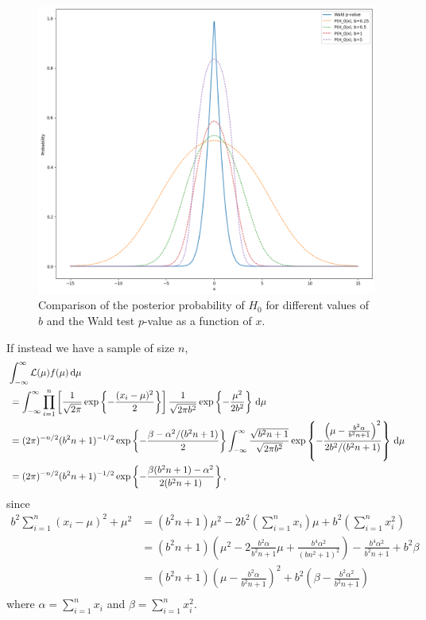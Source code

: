 \begin{ex}
  \inputminted{python}{../code/11-08a.py}
  \begin{figure}[H]
    \centering
    \includegraphics[scale=0.54]{../images/11-08a}
    \caption{Comparison of the posterior probability of $H_0$ for different
      values of $b$ and the Wald test $p$-value as a function of $x$.}
  \end{figure}

  If instead we have a sample of size $n$,
  \begin{align*}
     & \int_{-\infty}^\infty \mathcal{L}(\mu)f(\mu)\,\mathrm{d}\mu                                                                       \\
     & \,=\int_{-\infty}^\infty\prod_{i=1}^n\left[\frac{1}{\sqrt{2\pi}}\exp\left\{-\frac{(x_i-\mu)^2}{2}\right\}\right]
    \frac{1}{\sqrt{2\pi b^2}}\exp\left\{-\frac{\mu^2}{2b^2}\right\}\,\mathrm{d}\mu                                              \\
     & \, =(2\pi)^{-n/2}(b^2n+1)^{-1/2}\exp\left\{-\frac{\beta-\alpha^2/(b^2n+1)}{2}\right\}
    \int_{-\infty}^\infty \frac{\sqrt{b^2n+1}}{\sqrt{2\pi b^2}}\exp\left\{
    -\frac{\left(\mu-\frac{b^2\alpha}{b^2n+1}\right)^2}{2b^2/(b^2n+1)}
    \right\}\,\mathrm{d}{\mu}                                                                                                   \\
     & \, =(2\pi)^{-n/2}(b^2n+1)^{-1/2}\exp\left\{-\frac{\beta(b^2n+1)-\alpha^2}{2(b^2n+1)}\right\},
  \end{align*}
  since
  \begin{align*}
    b^2\sum_{i=1}^n(x_i-\mu)^2+\mu^2
     & =(b^2n+1)\mu^2-2b^2\left(\sum_{i=1}^nx_i\right)\mu+b^2\left(\sum_{i=1}^n x_i^2\right)                                        \\
     & =(b^2n+1)\left(\mu^2-2\frac{b^2\alpha}{b^2n+1}\mu+\frac{b^4\alpha^2}{(bn^2+1)^2} \right)-\frac{b^4\alpha^2}{b^2n+1}+b^2\beta \\
     & =(b^2n+1)\left(\mu-\frac{b^2\alpha}{b^2n+1}\right)^2+b^2\left(\beta-\frac{b^2\alpha^2}{b^2n+1}\right)                        \\
  \end{align*}
  where $\alpha=\sum_{i=1}^n x_i$ and $\beta=\sum_{i=1}^n x_i^2$.


\end{ex}
